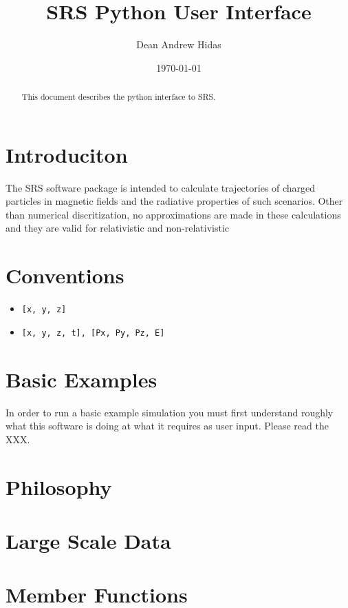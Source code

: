 \documentclass{article}
\title{SRS Python User Interface}
\author{Dean Andrew Hidas}
\date{\today}
\begin{document}
\maketitle

\begin{abstract}
This document describes the python interface to SRS.
\end{abstract}

\section{Introduciton}
The SRS software package is intended to calculate trajectories of charged particles in magnetic fields and the radiative properties of such scenarios.  Other than numerical discritization, no approximations are made in these calculations and they are valid for relativistic and non-relativistic


\section{Conventions}
\begin{itemize}
\item \begin{verbatim}[x, y, z]\end{verbatim}
\item \begin{verbatim}[x, y, z, t], [Px, Py, Pz, E]\end{verbatim}
\end{itemize}


\section{Basic Examples}
In order to run a basic example simulation you must first understand roughly what this software is doing at what it requires as user input.  Please read the XXX.


\section{Philosophy}


\section{Large Scale Data}


\section{Member Functions}
\end{document}
